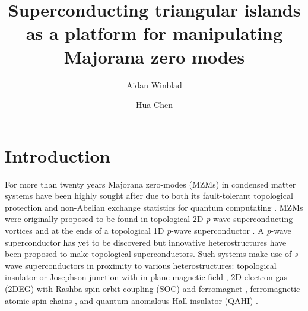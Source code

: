 \documentclass[aps,prb,showpacs,amsmath,amssymb,superscriptaddress]{revtex4-2}
\begin{document}
\title{Superconducting triangular islands as a platform for manipulating Majorana zero modes}

\author{Aidan Winblad}

\author{Hua Chen}

\maketitle

\section{Introduction}
For more than twenty years Majorana zero-modes (MZMs) in condensed matter systems have been highly sought after due to both its fault-tolerant topological protection and non-Abelian exchange statistics for quantum computating \cite{ivanovNonAbelianStatisticsHalfQuantum2001, kitaevFaulttolerantQuantumComputation2003, nayakNonAbelianAnyonsTopological2008, aliceaNonAbelianStatisticsTopological2011, aasenMilestonesMajoranaBasedQuantum2016}.
MZMs were originally proposed to be found in topological 2D \textit{p}-wave superconducting vortices and at the ends of a topological 1D \textit{p}-wave superconductor \cite{readPairedStatesFermions2000, kitaevUnpairedMajoranaFermions2001}.
A \textit{p}-wave superconductor has yet to be discovered but innovative heterostructures have been proposed to make topological superconductors.
Such systems make use of \textit{s}-wave superconductors in proximity to various heterostructures: topological insulator \cite{fuSuperconductingProximityEffect2008, hosurMajoranaModesEnds2011, potterEngineeringMathitipSuperconductor2011, veldhorstMagnetotransportInducedSuperconductivity2013} or Josephson junction with in plane magnetic field \cite{black-schafferMajoranaFermionsSpinorbitcoupled2011, pientkaSignaturesTopologicalPhase2013, hellTwoDimensionalPlatformNetworks2017, scharfTuningTopologicalSuperconductivity2019}, 2D electron gas (2DEG) with Rashba spin-orbit coupling (SOC) and ferromagnet \cite{oregHelicalLiquidsMajorana2010, sauGenericNewPlatform2010, lutchynSearchMajoranaFermions2011, potterTopologicalSuperconductivityMajorana2012, nadj-pergeProposalRealizingMajorana2013}, ferromagnetic atomic spin chains \cite{choyMajoranaFermionsEmerging2011, brauneckerInterplayClassicalMagnetic2013, klinovajaTopologicalSuperconductivityMajorana2013}, and quantum anomalous Hall insulator (QAHI) \cite{chenQuasionedimensionalQuantumAnomalous2018, zengQuantumAnomalousHall2018, xieCreatingLocalizedMajorana2021}.
\end{document}
